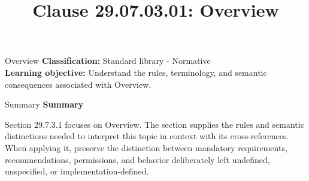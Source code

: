 \documentclass[10pt,letterpaper]{article}
\title{Clause 29.07.03.01: Overview}
\author{}
\date{}
\begin{document}
\maketitle
\begin{CornellOverviewBox}{Overview}
\textbf{Classification:} Standard library - Normative\\[2pt]
\textbf{Learning objective:} Understand the rules, terminology, and semantic consequences associated with Overview.
\end{CornellOverviewBox}\begin{CornellSummaryBox}{Summary}
{\sffamily\bfseries\color{Accent} Summary}\par\vspace{3pt}Section 29.7.3.1 focuses on Overview. The section supplies the rules and semantic distinctions needed to interpret this topic in context with its cross-references. When applying it, preserve the distinction between mandatory requirements, recommendations, permissions, and behavior deliberately left undefined, unspecified, or implementation-defined.
\end{CornellSummaryBox}
\end{document}
